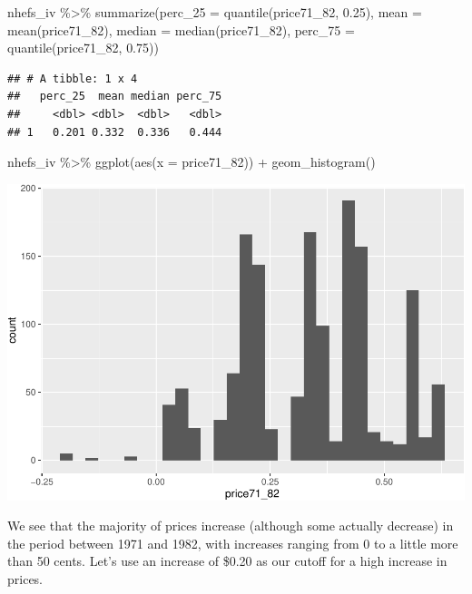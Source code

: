 \documentclass[
]{book}
\newenvironment{Shaded}{\begin{snugshade}}{\end{snugshade}}
\newcommand{\AttributeTok}[1]{\textcolor[rgb]{0.77,0.63,0.00}{#1}}
\newcommand{\FloatTok}[1]{\textcolor[rgb]{0.00,0.00,0.81}{#1}}
\newcommand{\FunctionTok}[1]{\textcolor[rgb]{0.00,0.00,0.00}{#1}}
\newcommand{\NormalTok}[1]{#1}
\newcommand{\SpecialCharTok}[1]{\textcolor[rgb]{0.00,0.00,0.00}{#1}}
\begin{document}
\begin{Shaded}
\begin{Highlighting}[]
\NormalTok{nhefs\_iv }\SpecialCharTok{\%\textgreater{}\%} 
  \FunctionTok{summarize}\NormalTok{(}\AttributeTok{perc\_25 =} \FunctionTok{quantile}\NormalTok{(price71\_82, }\FloatTok{0.25}\NormalTok{), }
            \AttributeTok{mean =} \FunctionTok{mean}\NormalTok{(price71\_82), }
            \AttributeTok{median =} \FunctionTok{median}\NormalTok{(price71\_82),}
            \AttributeTok{perc\_75 =} \FunctionTok{quantile}\NormalTok{(price71\_82, }\FloatTok{0.75}\NormalTok{))}
\end{Highlighting}
\end{Shaded}

\begin{verbatim}
## # A tibble: 1 x 4
##   perc_25  mean median perc_75
##     <dbl> <dbl>  <dbl>   <dbl>
## 1   0.201 0.332  0.336   0.444
\end{verbatim}

\begin{Shaded}
\begin{Highlighting}[]
\NormalTok{nhefs\_iv }\SpecialCharTok{\%\textgreater{}\%} 
  \FunctionTok{ggplot}\NormalTok{(}\FunctionTok{aes}\NormalTok{(}\AttributeTok{x =}\NormalTok{ price71\_82)) }\SpecialCharTok{+} 
  \FunctionTok{geom\_histogram}\NormalTok{()}
\end{Highlighting}
\end{Shaded}

\includegraphics{adv_epi_analysis_files/figure-latex/unnamed-chunk-324-1.pdf}

We see that the majority of prices increase (although some actually decrease) in the period between 1971 and 1982, with increases ranging from 0 to a little more than 50 cents. Let's use an increase of \$0.20 as our cutoff for a high increase in prices.
\end{document}
